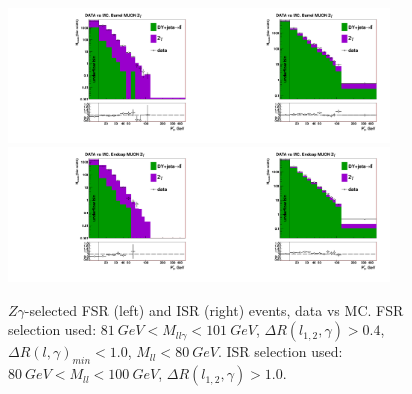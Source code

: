 \begin{figure}[htb]
  \begin{center}
   \includegraphics[width=0.45\textwidth]{../figs/figs_v11/MUON_ZGamma/PrepareYields/c_TotalDATAvsMC_Barrel__phoEtFSR.pdf}\includegraphics[width=0.45\textwidth]{../figs/figs_v11/MUON_ZGamma/PrepareYields/c_TotalDATAvsMC_Barrel__phoEtFSR_EXCLUDED.pdf}\\
   \includegraphics[width=0.45\textwidth]{../figs/figs_v11/MUON_ZGamma/PrepareYields/c_TotalDATAvsMC_Endcap__phoEtFSR.pdf}\includegraphics[width=0.45\textwidth]{../figs/figs_v11/MUON_ZGamma/PrepareYields/c_TotalDATAvsMC_Endcap__phoEtFSR_EXCLUDED.pdf}\\
  \caption{$Z\gamma$-selected FSR (left) and ISR (right) events, data vs MC. FSR selection used: $81~GeV<M_{ll\gamma}<101~GeV$, $\Delta{R}(l_{1,2},\gamma)>0.4$, $\Delta{R}(l,\gamma)_{min}<1.0$, $M_{ll}<80~GeV$. ISR selection used: $80~GeV<M_{ll}<100~GeV$, $\Delta{R}(l_{1,2},\gamma)>1.0$.}
  \label{fig:Zg_ISRandFSR_phoEt}
  \end{center}
\end{figure}

